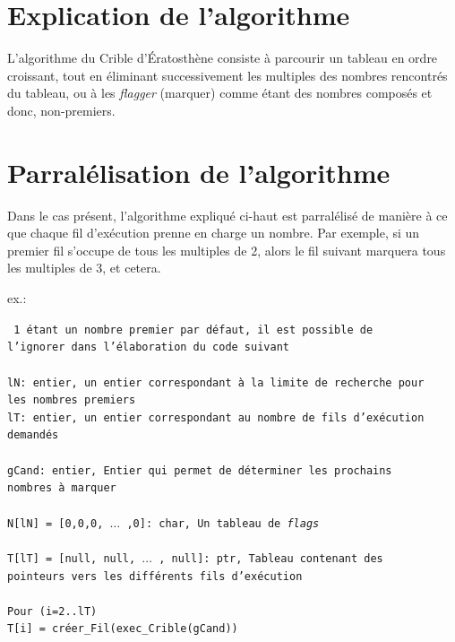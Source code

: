 \documentclass{report}
\def\code#1{\texttt{#1}} %
\def\comment#1{\color{gray} #1 \color{black}}
\begin{document}
	\section{Explication de l'algorithme}

		L'algorithme du Crible d'Ératosthène consiste à parcourir un tableau
		en ordre croissant, tout en éliminant successivement les multiples des
		nombres rencontrés du tableau, ou à les {\it flagger} (marquer) comme
		étant des nombres composés et donc, non-premiers.
	\bigskip
	\section{Parralélisation de l'algorithme}

		Dans le cas présent, l'algorithme expliqué ci-haut est parralélisé de
		manière à ce que chaque fil d'exécution prenne en charge un nombre.
		Par exemple, si un premier fil s'occupe de tous les multiples de 2,
		alors le fil suivant marquera tous les multiples de 3, et cetera.

		\bigskip
		\noindent ex.:

		\noindent
		\code{
			\comment{
			1 étant un nombre premier par défaut, il est possible de \\l'ignorer
			dans l'élaboration du code suivant
			} \\
			\\
			lN: entier, \comment{un entier correspondant à la limite de recherche
			pour \\les nombres premiers}\\
			lT: entier, \comment{un entier correspondant au nombre de fils
			d'exécution \\demandés} \\
			\\
			gCand: entier, \comment{Entier qui permet de déterminer les prochains
			\\nombres à marquer} \\
			\\
			N[lN] = [0,0,0, $\ldots$ ,0]: char, \comment{Un tableau de {\it flags}} \\
			\\
			T[lT] = [null, null, $\ldots$ , null]: ptr, \comment{Tableau contenant
			des \\pointeurs vers les différents fils d'exécution} \\
			\\
			Pour (i=2..lT) \\
			\hspace*{16pt} T[i] = créer\_Fil(exec\_Crible(gCand))
		}
\end{document}
